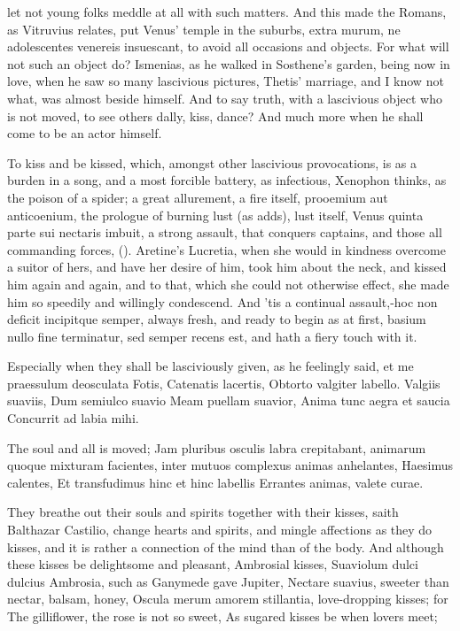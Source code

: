 let not young folks meddle at all with such matters. And this made the
Romans, as Vitruvius relates, put Venus' temple in the suburbs,
extra murum, ne adolescentes venereis insuescant, to avoid all
occasions and objects. For what will not such an object do? Ismenias,
as he walked in Sosthene's garden, being now in love, when he saw so
many lascivious pictures, Thetis' marriage, and I know not what,
was almost beside himself. And to say truth, with a lascivious object
who is not moved, to see others dally, kiss, dance? And much more when
he shall come to be an actor himself.

To kiss and be kissed, which, amongst other lascivious provocations, is
as a burden in a song, and a most forcible battery, as infectious,
 Xenophon thinks, as the poison of a spider; a great allurement,
a fire itself, prooemium aut anticoenium, the prologue of burning lust
(as \Apuleius adds), lust itself, Venus quinta parte sui nectaris
imbuit, a strong assault, that conquers captains, and those all
commanding forces, ().
Aretine's Lucretia, when she would in kindness overcome a suitor
of hers, and have her desire of him, took him about the neck, and
kissed him again and again, and to that, which she could not otherwise
effect, she made him so speedily and willingly condescend. And 'tis a
continual assault,-hoc non deficit incipitque semper, always
fresh, and ready to begin as at first, basium nullo fine
terminatur, sed semper recens est, and hath a fiery touch with it.

Especially when they shall be lasciviously given, as he feelingly said,
et me praessulum deosculata Fotis, Catenatis lacertis, 
Obtorto valgiter labello.
Valgiis suaviis,
Dum semiulco suavio
Meam puellam suavior,
Anima tunc aegra et saucia
Concurrit ad labia mihi.

The soul and all is moved; Jam pluribus osculis labra
crepitabant, animarum quoque mixturam facientes, inter mutuos complexus
animas anhelantes,
Haesimus calentes,
Et transfudimus hinc et hinc labellis
Errantes animas, valete curae.

They breathe out their souls and spirits together with their kisses,
saith Balthazar Castilio, change hearts and spirits, and mingle
affections as they do kisses, and it is rather a connection of the mind
than of the body. And although these kisses be delightsome and
pleasant, Ambrosial kisses, Suaviolum dulci dulcius Ambrosia,
such as  Ganymede gave Jupiter, Nectare suavius, sweeter than
nectar, balsam, honey, Oscula merum amorem stillantia,
love-dropping kisses; for
The gilliflower, the rose is not so sweet,
As sugared kisses be when lovers meet;

